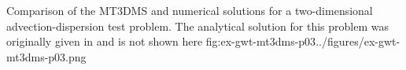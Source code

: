 \begin{StandardFigure}
	{Comparison of the MT3DMS and \mf numerical solutions for a two-dimensional advection-dispersion test problem.  The analytical solution for this problem was originally given in \cite{wilson1978} and is not shown here}
	{fig:ex-gwt-mt3dms-p03}{../figures/ex-gwt-mt3dms-p03.png}
\end{StandardFigure}